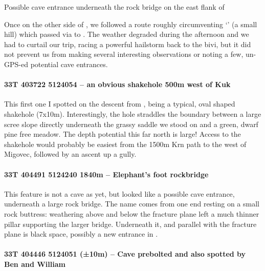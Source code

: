 \begin{marginfigure}
        \centering
        
        \caption{Possible cave entrance underneath the rock bridge on the east flank of \protect{}  } \label{rockbridge}
    \end{marginfigure}
    

Once on the other side of , we followed a route roughly circumventing `' (a small hill) which passed via  to . The weather degraded during the afternoon and we had to curtail our trip, racing a powerful hailstorm back to the bivi, but it did not prevent us from making several interesting observations or noting a few, un-GPS-ed potential cave entrances.

\paragraph{33T 403722 5124054 – an obvious shakehole 500m west of Kuk}

This first one I spotted on the descent from , being a typical, oval shaped shakehole (7x10m). Interestingly, the hole straddles the boundary between a large scree slope directly underneath the grassy saddle we stood on and a green, dwarf pine free meadow. The depth potential this far north is large!  Access to the shakehole would probably be easiest from the 1500m Krn path to the west of Migovec, followed by an ascent up a gully. 

\paragraph{33T 404491 5124240  1840m – Elephant's foot rockbridge}


This feature is not a cave as yet, but looked like a possible cave entrance, underneath a large rock bridge. The name comes from one end resting on a small rock buttress: weathering above and below the fracture plane left a much thinner pillar supporting the larger bridge. Underneath it, and parallel with the fracture plane is black space, possibly a new entrance in .

\paragraph{33T 404446 5124051 (±10m) – Cave prebolted and also spotted by Ben and William}

